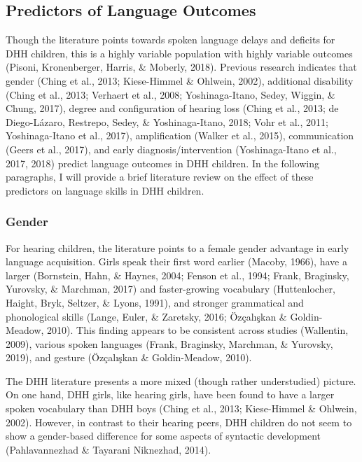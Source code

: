 \documentclass[english,man]{apa6}
\begin{document}
\hypertarget{predictors-of-language-outcomes}{%
\subsection{Predictors of Language Outcomes}\label{predictors-of-language-outcomes}}

Though the literature points towards spoken language delays and deficits for DHH children, this is a highly variable population with highly variable outcomes (Pisoni, Kronenberger, Harris, \& Moberly, 2018). Previous research indicates that gender (Ching et al., 2013; Kiese-Himmel \& Ohlwein, 2002), additional disability (Ching et al., 2013; Verhaert et al., 2008; Yoshinaga-Itano, Sedey, Wiggin, \& Chung, 2017), degree and configuration of hearing loss (Ching et al., 2013; de Diego-Lázaro, Restrepo, Sedey, \& Yoshinaga-Itano, 2018; Vohr et al., 2011; Yoshinaga-Itano et al., 2017), amplification (Walker et al., 2015), communication (Geers et al., 2017), and early diagnosis/intervention (Yoshinaga-Itano et al., 2017, 2018) predict language outcomes in DHH children. In the following paragraphs, I will provide a brief literature review on the effect of these predictors on language skills in DHH children.

\hypertarget{gender}{%
\subsubsection{Gender}\label{gender}}

For hearing children, the literature points to a female gender advantage in early language acquisition. Girls speak their first word earlier (Macoby, 1966), have a larger (Bornstein, Hahn, \& Haynes, 2004; Fenson et al., 1994; Frank, Braginsky, Yurovsky, \& Marchman, 2017) and faster-growing vocabulary (Huttenlocher, Haight, Bryk, Seltzer, \& Lyons, 1991), and stronger grammatical and phonological skills (Lange, Euler, \& Zaretsky, 2016; Özçalışkan \& Goldin-Meadow, 2010). This finding appears to be consistent across studies (Wallentin, 2009), various spoken languages (Frank, Braginsky, Marchman, \& Yurovsky, 2019), and gesture (Özçalışkan \& Goldin-Meadow, 2010).

The DHH literature presents a more mixed (though rather understudied) picture. On one hand, DHH girls, like hearing girls, have been found to have a larger spoken vocabulary than DHH boys (Ching et al., 2013; Kiese-Himmel \& Ohlwein, 2002). However, in contrast to their hearing peers, DHH children do not seem to show a gender-based difference for some aspects of syntactic development (Pahlavannezhad \& Tayarani Niknezhad, 2014).
\end{document}
